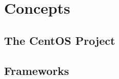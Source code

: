 \documentclass[12pt]{book}
\renewcommand{\chaptermark}[1]{\markboth{#1}{}}
\begin{document}
\frontmatter
\pagestyle{fancy}

\tableofcontents
\listoftables
\listoffigures

\renewcommand{\chaptermark}[1]{\markboth{#1}{}}




\mainmatter

\renewcommand{\chaptermark}[1]{\markboth{%
   \chaptername\ \thechapter.\ #1}{}}

\part{Concepts}

\chapter{The CentOS Project}
   \hypertarget{cha:Concepts:CentOS}{}
   \label{cha:Concepts:CentOS}
   
   
   
   
   
   
   

\chapter{Frameworks}
   \hypertarget{cha:Concepts:frameworks}{}
   \label{cha:Concepts:Frameworks}
   
   
   
   
\end{document}
